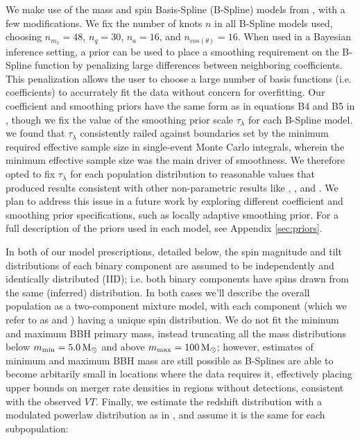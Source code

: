 We make use of the mass and spin Basis-Spline (B-Spline) models from \cite{2022arXiv221012834E}, with a few modifications. We fix the number of knots $n$ in all B-Spline models used, choosing $n_{m_1}=48$, $n_{q}=30$, $n_a=16$, and $n_{cos(\theta)}=16$. When used in a Bayesian inference setting, a prior can be used to place a smoothing requirement on the B-Spline function by penalizing large differences between neighboring coefficients. This penalization allows the user to choose a large number of basis functions (i.e. coefficients) to accurrately fit the data without concern for overfitting. Our coefficient and smoothing priors have the same form as in equations B4 and B5 in \brucepaper{}, though we fix the value of the smoothing prior scale $\tau_\lambda$ for each B-Spline model. we found that $\tau_\lambda$ consistently railed against boundaries set by the minimum required effective sample size in single-event Monte Carlo integrals, wherein the minimum effective sample size was the main driver of smoothness. We therefore opted to fix $\tau_\lambda$ for each population distribution to reasonable values that produced results consistent with other non-parametric results like \citet{2022ApJ...924..101E}, \brucepaper{}, and \citet{10.48550/arXiv.2302.07289}. We plan to address this issue in a future work by exploring different coefficient and smoothing prior specifications, such as locally adaptive smoothing prior. For a full description of the priors used in each model, see Appendix \ref{sec:priors}.

In both of our model prescriptions, detailed below, the spin magnitude and tilt distributions of each binary component are assumed to be independently and identically distributed (IID); i.e. both binary components have spins drawn from the same (inferred) distribution. In both cases we'll describe the overall population as a two-component mixture model, with each component (which we refer to as \popA{} and \popB{}) having a unique spin distribution. We do not fit the mininum and maximum BBH primary mass, instead truncating all the mass distributions below $m_\text{min} = 5.0{\,\rm M}_\odot$ and above $m_\text{max} = 100{\,\rm M}_\odot$; however, estimates of minimum and maximum BBH mass are still possible as B-Splines are able to become arbitarily small in locations where the data requires it, effectively placing upper bounds on merger rate densities in regions without detections, consistent with the observed $VT$. Finally, we estimate the redshift distribution with a modulated powerlaw distribution as in \brucepaper, and assume it is the same for each subpopulation:

